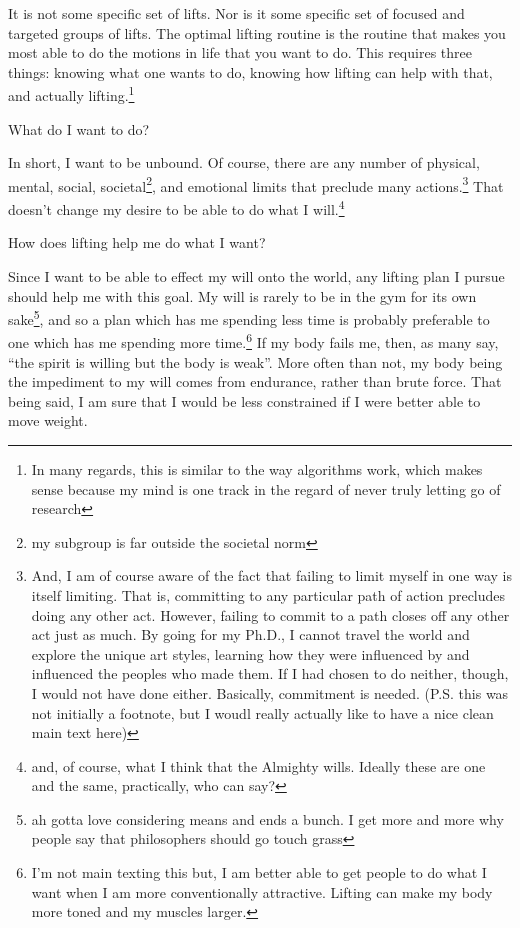 \documentclass[12pt]{article}
\newcommand{\say}[1]{``#1''}
\renewcommand{\,}{\textsuperscript{,}}
\begin{document}
It is not some specific set of lifts.  
Nor is it some specific set of focused and targeted groups of lifts.  
The optimal lifting routine is the routine that makes you most able to do the motions in life that you want to do.  
This requires three things: knowing what one wants to do, knowing how lifting can help with that, and actually lifting.\footnote{In many regards, this is similar to the way algorithms work, which makes sense because my mind is one track in the regard of never truly letting go of research}

What do I want to do?

In short, I want to be unbound.  
Of course, there are any number of physical, mental, social, societal\footnote{my subgroup is far outside the societal norm}, and emotional limits that preclude many actions.\footnote{And, I am of course aware of the fact that failing to limit myself in one way is itself limiting.  
That is, committing to any particular path of action precludes doing any other act.  
However, failing to commit to a path closes off any other act just as much.  
By going for my Ph.D., I cannot travel the world and explore the unique art styles, learning how they were influenced by and influenced the peoples who made them.  
If I had chosen to do neither, though, I would not have done either.  
Basically, commitment is needed. (P.S. this was not initially a footnote, but I woudl really actually like to have a nice clean main text here)}  
That doesn't change my desire to be able to do what I will.\footnote{and, of course, what I think that the Almighty wills. Ideally these are one and the same, practically, who can say?}

How does lifting help me do what I want?

Since I want to be able to effect my will onto the world, any lifting plan I pursue should help me with this goal.  
My will is rarely to be in the gym for its own sake\footnote{ah gotta love considering means and ends a bunch. I get more and more why people say that philosophers should go touch grass}, and so a plan which has me spending less time is probably preferable to one which has me spending more time.\footnote{I'm not main texting this but, I am better able to get people to do what I want when I am more conventionally attractive.  
Lifting can make my body more toned and my muscles larger.}  
If my body fails me, then, as many say, \say{the spirit is willing but the body is weak}.  
More often than not, my body being the impediment to my will comes from endurance, rather than brute force.  
That being said, I am sure that I would be less constrained if I were better able to move weight.
\end{document}

